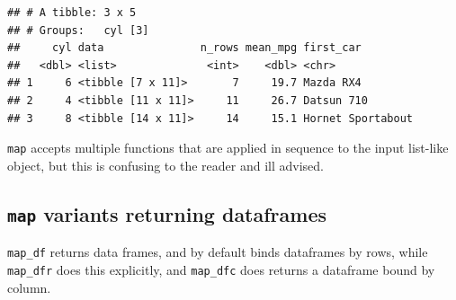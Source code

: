 \documentclass[]{book}
\newenvironment{Shaded}{}{}
\newcommand{\CommentTok}[1]{\textcolor[rgb]{0.38,0.63,0.69}{\textit{#1}}}
\newcommand{\DataTypeTok}[1]{\textcolor[rgb]{0.56,0.13,0.00}{#1}}
\newcommand{\KeywordTok}[1]{\textcolor[rgb]{0.00,0.44,0.13}{\textbf{#1}}}
\newcommand{\NormalTok}[1]{#1}
\newcommand{\OperatorTok}[1]{\textcolor[rgb]{0.40,0.40,0.40}{#1}}
\newcommand{\StringTok}[1]{\textcolor[rgb]{0.25,0.44,0.63}{#1}}
\begin{document}
\begin{Shaded}
\end{Shaded}

\begin{verbatim}
## # A tibble: 3 x 5
## # Groups:   cyl [3]
##     cyl data               n_rows mean_mpg first_car        
##   <dbl> <list>              <int>    <dbl> <chr>            
## 1     6 <tibble [7 x 11]>       7     19.7 Mazda RX4        
## 2     4 <tibble [11 x 11]>     11     26.7 Datsun 710       
## 3     8 <tibble [14 x 11]>     14     15.1 Hornet Sportabout
\end{verbatim}

\texttt{map} accepts multiple functions that are applied in sequence to the input list-like object, but this is confusing to the reader and ill advised.

\hypertarget{map-variants-returning-dataframes}{%
\subsection{\texorpdfstring{\texttt{map} variants returning dataframes}{map variants returning dataframes}}\label{map-variants-returning-dataframes}}

\texttt{map\_df} returns data frames, and by default binds dataframes by rows, while \texttt{map\_dfr} does this explicitly, and \texttt{map\_dfc} does returns a dataframe bound by column.
\end{document}
